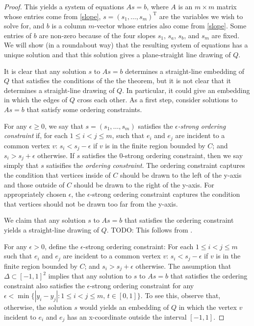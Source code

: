 \documentclass{patmorin}
\begin{document}
\begin{proof}
   This yields a system of equations $As = b$, where $A$ is
   an $m\times m$ matrix whose entries come from \eqref{slope},
   $s=(s_1,\ldots,s_m)^\mathrm{T}$ are the variables we wish to solve
   for, and $b$ is a column $m$-vector whose entries also come from
   \eqref{slope}.  Some entries of $b$ are non-zero because of the four
   slopes $s_1$, $s_a$, $s_b$, and $s_m$ are fixed.  We will show (in a
   roundabout way) that the resulting system of equations has a unique
   solution and that this solution gives a plane-straight line drawing
   of $Q$.

   It is clear that any solution $s$ to $As=b$ determines a straight-line
   embedding of $Q$ that satisfies the conditions of the the theorem,
   but it is not clear that it determines a straight-line drawing of $Q$.
   In particular, it could give an embedding in which the edges of $Q$ cross
   each other.  As a first step, consider solutions to $As=b$ that satisfy
   some ordering constraints.  

   For any $\epsilon \ge 0$, we say that $s=(s_1,\ldots,s_m)$ satisfies
   the \emph{$\epsilon$-strong ordering constraint} if, for each $1\le
   i<j\le m$, such that $e_i$ and $e_j$ are incident to a common vertex
   $v$: $s_i < s_j -\epsilon$ if $v$ is in the finite region bounded
   by $C$; and $s_i > s_j+\epsilon$ otherwise.  If $s$ satisfies the
   $0$-strong ordering constraint, then we say simply that $s$ satisifies
   the \emph{ordering constraint}.  The ordering constraint captures the
   condition that vertices inside of $C$ should be drawn to the left of
   the y-axis and those outside of $C$ should be drawn to the right of
   the y-axis.  For appropriately chosen $\epsilon$, the $\epsilon$-strong
   ordering constraint captures the condition that vertices should not
   be drawn too far from the y-axis.

   We claim that any solution $s$ to $As=b$ that satisfies the ordering
   constraint yields a straight-line drawing of $Q$.  TODO: This follows
   from .

   For any $\epsilon >0$, define the $\epsilon$-strong ordering
   constraint: For each $1\le i<j\le m$ such that $e_i$ and $e_j$
   are incident to a common vertex $v$: $s_i < s_j - \epsilon$ if $v$
   is in the finite region bounded by $C$; and $s_i > s_j + \epsilon$
   otherwise.  The assumption that $\Delta\subset [-1,1]^2$ implies
   that any solution to $s$ to $As=b$ that satisfies the ordering
   constraint also satisfies the $\epsilon$-strong ordering constraint
   for any $\epsilon<\min\{|y_i-y_j| : 1\le i< j\le m,\, t\in[0,1]\}$.
   To see this, observe that, otherwise, the solution $s$ would yields an
   embedding of $Q$ in which the vertex $v$ incident to $e_i$ and $e_j$
   has an x-coordinate outside the interval $[-1,1]$.


\end{proof}
\end{document}

